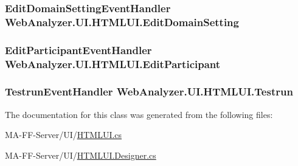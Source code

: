 \subsubsection[{Edit\+Domain\+Setting}]{\setlength{\rightskip}{0pt plus 5cm}Edit\+Domain\+Setting\+Event\+Handler Web\+Analyzer.\+U\+I.\+H\+T\+M\+L\+U\+I.\+Edit\+Domain\+Setting}\label{class_web_analyzer_1_1_u_i_1_1_h_t_m_l_u_i_aec067a24868c0ce06c3dd5ca4caccd8b}
\hypertarget{class_web_analyzer_1_1_u_i_1_1_h_t_m_l_u_i_a41d7bba18de0e030779e1bc57de9d267}{}
\subsubsection[{Edit\+Participant}]{\setlength{\rightskip}{0pt plus 5cm}Edit\+Participant\+Event\+Handler Web\+Analyzer.\+U\+I.\+H\+T\+M\+L\+U\+I.\+Edit\+Participant}\label{class_web_analyzer_1_1_u_i_1_1_h_t_m_l_u_i_a41d7bba18de0e030779e1bc57de9d267}
\hypertarget{class_web_analyzer_1_1_u_i_1_1_h_t_m_l_u_i_adb77cf3b6fe81466fc13561570764024}{}
\subsubsection[{Testrun}]{\setlength{\rightskip}{0pt plus 5cm}Testrun\+Event\+Handler Web\+Analyzer.\+U\+I.\+H\+T\+M\+L\+U\+I.\+Testrun}\label{class_web_analyzer_1_1_u_i_1_1_h_t_m_l_u_i_adb77cf3b6fe81466fc13561570764024}


The documentation for this class was generated from the following files\+:\begin{DoxyCompactItemize}
\item 
M\+A-\/\+F\+F-\/\+Server/\+U\+I/\hyperlink{_h_t_m_l_u_i_8cs}{H\+T\+M\+L\+U\+I.\+cs}\item 
M\+A-\/\+F\+F-\/\+Server/\+U\+I/\hyperlink{_h_t_m_l_u_i_8_designer_8cs}{H\+T\+M\+L\+U\+I.\+Designer.\+cs}\end{DoxyCompactItemize}
